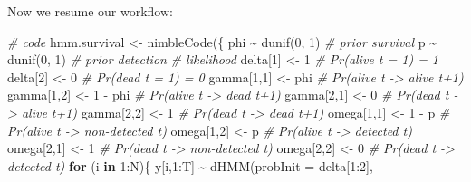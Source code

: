 \documentclass[
  12pt,
]{krantz}
\newenvironment{Shaded}{\begin{snugshade}}{\end{snugshade}}
\newcommand{\AttributeTok}[1]{\textcolor[rgb]{0.77,0.63,0.00}{#1}}
\newcommand{\CommentTok}[1]{\textcolor[rgb]{0.56,0.35,0.01}{\textit{#1}}}
\newcommand{\ControlFlowTok}[1]{\textcolor[rgb]{0.13,0.29,0.53}{\textbf{#1}}}
\newcommand{\DecValTok}[1]{\textcolor[rgb]{0.00,0.00,0.81}{#1}}
\newcommand{\FunctionTok}[1]{\textcolor[rgb]{0.00,0.00,0.00}{#1}}
\newcommand{\NormalTok}[1]{#1}
\newcommand{\OtherTok}[1]{\textcolor[rgb]{0.56,0.35,0.01}{#1}}
\newcommand{\SpecialCharTok}[1]{\textcolor[rgb]{0.00,0.00,0.00}{#1}}
\begin{document}
Now we resume our workflow:

\begin{Shaded}
\begin{Highlighting}[]
\CommentTok{\# code}
\NormalTok{hmm.survival }\OtherTok{\textless{}{-}} \FunctionTok{nimbleCode}\NormalTok{(\{}
\NormalTok{  phi }\SpecialCharTok{\textasciitilde{}} \FunctionTok{dunif}\NormalTok{(}\DecValTok{0}\NormalTok{, }\DecValTok{1}\NormalTok{) }\CommentTok{\# prior survival}
\NormalTok{  p }\SpecialCharTok{\textasciitilde{}} \FunctionTok{dunif}\NormalTok{(}\DecValTok{0}\NormalTok{, }\DecValTok{1}\NormalTok{) }\CommentTok{\# prior detection}
  \CommentTok{\# likelihood}
\NormalTok{  delta[}\DecValTok{1}\NormalTok{] }\OtherTok{\textless{}{-}} \DecValTok{1}          \CommentTok{\# Pr(alive t = 1) = 1}
\NormalTok{  delta[}\DecValTok{2}\NormalTok{] }\OtherTok{\textless{}{-}} \DecValTok{0}          \CommentTok{\# Pr(dead t = 1) = 0}
\NormalTok{  gamma[}\DecValTok{1}\NormalTok{,}\DecValTok{1}\NormalTok{] }\OtherTok{\textless{}{-}}\NormalTok{ phi      }\CommentTok{\# Pr(alive t {-}\textgreater{} alive t+1)}
\NormalTok{  gamma[}\DecValTok{1}\NormalTok{,}\DecValTok{2}\NormalTok{] }\OtherTok{\textless{}{-}} \DecValTok{1} \SpecialCharTok{{-}}\NormalTok{ phi  }\CommentTok{\# Pr(alive t {-}\textgreater{} dead t+1)}
\NormalTok{  gamma[}\DecValTok{2}\NormalTok{,}\DecValTok{1}\NormalTok{] }\OtherTok{\textless{}{-}} \DecValTok{0}        \CommentTok{\# Pr(dead t {-}\textgreater{} alive t+1)}
\NormalTok{  gamma[}\DecValTok{2}\NormalTok{,}\DecValTok{2}\NormalTok{] }\OtherTok{\textless{}{-}} \DecValTok{1}        \CommentTok{\# Pr(dead t {-}\textgreater{} dead t+1)}
\NormalTok{  omega[}\DecValTok{1}\NormalTok{,}\DecValTok{1}\NormalTok{] }\OtherTok{\textless{}{-}} \DecValTok{1} \SpecialCharTok{{-}}\NormalTok{ p    }\CommentTok{\# Pr(alive t {-}\textgreater{} non{-}detected t)}
\NormalTok{  omega[}\DecValTok{1}\NormalTok{,}\DecValTok{2}\NormalTok{] }\OtherTok{\textless{}{-}}\NormalTok{ p        }\CommentTok{\# Pr(alive t {-}\textgreater{} detected t)}
\NormalTok{  omega[}\DecValTok{2}\NormalTok{,}\DecValTok{1}\NormalTok{] }\OtherTok{\textless{}{-}} \DecValTok{1}        \CommentTok{\# Pr(dead t {-}\textgreater{} non{-}detected t)}
\NormalTok{  omega[}\DecValTok{2}\NormalTok{,}\DecValTok{2}\NormalTok{] }\OtherTok{\textless{}{-}} \DecValTok{0}        \CommentTok{\# Pr(dead t {-}\textgreater{} detected t)}
  \ControlFlowTok{for}\NormalTok{ (i }\ControlFlowTok{in} \DecValTok{1}\SpecialCharTok{:}\NormalTok{N)\{}
\NormalTok{    y[i,}\DecValTok{1}\SpecialCharTok{:}\NormalTok{T] }\SpecialCharTok{\textasciitilde{}} \FunctionTok{dHMM}\NormalTok{(}\AttributeTok{probInit =}\NormalTok{ delta[}\DecValTok{1}\SpecialCharTok{:}\DecValTok{2}\NormalTok{], }

\end{Highlighting}
\end{Shaded}
\end{document}
